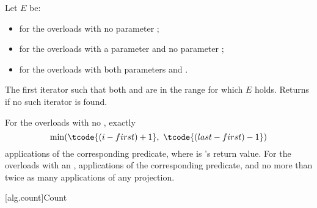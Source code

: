 \begin{itemdescr}
\pnum
Let $E$ be:
\begin{itemize}
\setlength{\emergencystretch}{1em}
\item {} for the overloads with no parameter ;
\item {} for the overloads with a parameter  and no parameter ;
\item {} for the overloads with both parameters  and .
\end{itemize}

\pnum
\returns
The first iterator 
such that both  and  are in the range 
for which $E$ holds.
Returns  if no such iterator is found.

\pnum
\complexity
For the overloads with no ,
exactly \[ \min(\tcode{(i - first) + 1}, \ \tcode{(last - first) - 1}) \]
applications of the corresponding predicate,
where  is 's return value.
For the overloads with an ,
 applications of the corresponding predicate,
and no more than twice as many applications of any projection.
\end{itemdescr}

[alg.count]{Count}

